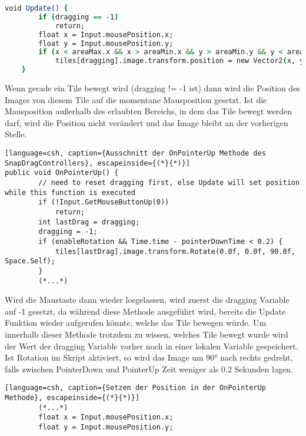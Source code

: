 {\begin{lstlisting}[language=csh, caption={Update Methode des SnapDragControllers}]
void Update() {
        if (dragging == -1)
            return;
        float x = Input.mousePosition.x;
        float y = Input.mousePosition.y;
        if (x < areaMax.x && x > areaMin.x && y > areaMin.y && y < areaMax.y)
            tiles[dragging].image.transform.position = new Vector2(x, y);
    }
\end{lstlisting}
Wenn gerade ein Tile bewegt wird (dragging != -1 ist) dann wird die Position des Images von diesem Tile auf die momentane Mausposition gesetzt. Ist die Mausposition außerhalb des erlaubten Bereichs, in dem das Tile bewegt werden darf, wird die Position nicht verändert und das Image bleibt an der vorherigen Stelle.\\

\begin{lstlisting}[language=csh, caption={Ausschnitt der OnPointerUp Methode des SnapDragControllers}, escapeinside={(*}{*)}]
public void OnPointerUp() {
        // need to reset dragging first, else Update will set position while this function is executed
        if (!Input.GetMouseButtonUp(0))
            return;
        int lastDrag = dragging;
        dragging = -1;
        if (enableRotation && Time.time - pointerDownTime < 0.2) {
            tiles[lastDrag].image.transform.Rotate(0.0f, 0.0f, 90.0f, Space.Self);
        }
        (*...*)
\end{lstlisting}
Wird die Maustaste dann wieder losgelassen, wird zuerst die dragging Variable auf -1 gesetzt, da während diese Methode ausgeführt wird, bereits die Update Funktion wieder aufgerufen könnte, welche das Tile bewegen würde. Um innerhalb dieser Methode trotzdem zu wissen, welches Tile bewegt wurde wird der Wert der dragging Variable vorher noch in einer lokalen Variable gespeichert.\\
Ist Rotation im Skript aktiviert, so wird das Image um 90° nach rechts gedreht, falls zwischen PointerDown und PointerUp Zeit weniger als 0.2 Sekunden lagen.\\
\begin{lstlisting}[language=csh, caption={Setzen der Position in der OnPointerUp Methode}, escapeinside={(*}{*)}]
		(*...*)
 		float x = Input.mousePosition.x;
        float y = Input.mousePosition.y;


\end{lstlisting}}
